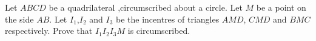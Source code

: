 Let $ABCD$ be a quadrilateral ,circumscribed about a circle. Let $M$ be a point on the side $AB$. Let $I_{1}$,$I_{2}$ and $I_{3}$ be the incentres of triangles $AMD$, $CMD$ and $BMC$ respectively. Prove that $I_{1}I_{2}I_{3}M$ is circumscribed.